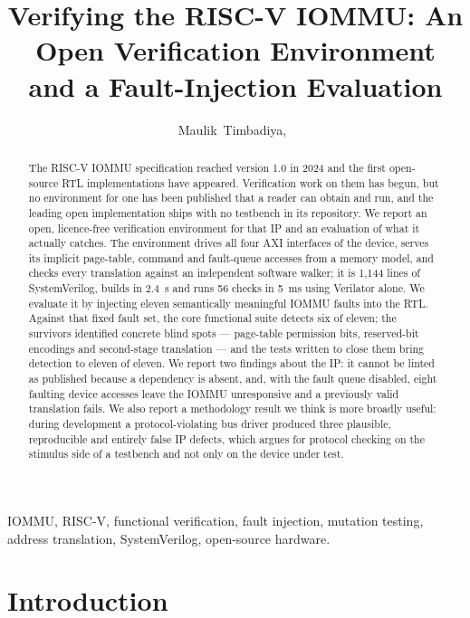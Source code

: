 \documentclass[journal]{IEEEtran}
\begin{document}
\title{Verifying the RISC-V IOMMU: An Open Verification Environment\\and a Fault-Injection Evaluation}
\author{Maulik~Timbadiya,~}
\maketitle

\begin{abstract}
The RISC-V IOMMU specification reached version 1.0 in 2024 and the first
open-source RTL implementations have appeared. Verification work on them has
begun, but no environment for one has been published that a reader can obtain
and run, and the leading open implementation ships with no testbench in its
repository. We report an open, licence-free verification
environment for that IP and an evaluation of what it actually catches. The
environment drives all four AXI interfaces of the device, serves its
implicit page-table, command and fault-queue accesses from a memory model,
and checks every translation against an independent software walker; it is
1{,}144 lines of SystemVerilog, builds in 2.4~s and runs 56 checks in 5~ms
using Verilator alone. We evaluate it by injecting eleven semantically
meaningful IOMMU faults into the RTL. Against that fixed fault set, the core
functional suite detects six of eleven;
the survivors identified concrete blind spots --- page-table permission bits,
reserved-bit encodings and second-stage translation --- and the tests written
to close them bring detection to eleven of eleven. We report two findings
about the IP: it cannot be linted as published because a dependency is absent,
and, with the fault queue disabled, eight faulting device accesses leave the
IOMMU unresponsive and a previously valid translation fails. We also report a
methodology result we think is more broadly useful: during development a
protocol-violating bus driver produced three plausible, reproducible and
entirely false IP defects, which argues for protocol checking on the stimulus
side of a testbench and not only on the device under test.
\end{abstract}

\begin{IEEEkeywords}
IOMMU, RISC-V, functional verification, fault injection, mutation testing,
address translation, SystemVerilog, open-source hardware.
\end{IEEEkeywords}

\section{Introduction}
\end{document}
